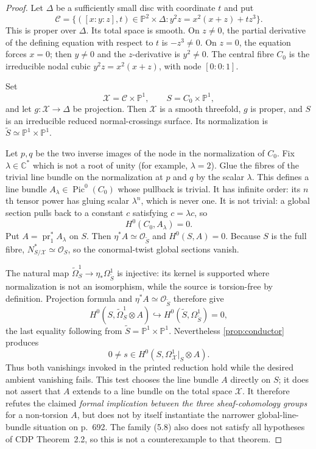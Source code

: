 \begin{proof}
Let $\Delta$ be a sufficiently small disc with coordinate $t$ and put
\[
\mathcal C=
\{([x:y:z],t)\in\mathbb P^2\times\Delta:
y^2z=x^2(x+z)+tz^3\}.
\tag{5.8}
\]
This is proper over $\Delta$.  Its total space is smooth.  On $z\ne0$, the
partial derivative of the defining equation with respect to $t$ is
$-z^3\ne0$.  On $z=0$, the equation forces $x=0$; then $y\ne0$ and the
$z$-derivative is $y^2\ne0$.  The central fibre $C_0$ is the irreducible
nodal cubic $y^2z=x^2(x+z)$, with node $[0:0:1]$.

Set
\[
\mathcal X=\mathcal C\times\mathbb P^1,\qquad
S=C_0\times\mathbb P^1,
\]
and let $g:\mathcal X\to\Delta$ be projection.  Then $\mathcal X$ is a
smooth threefold, $g$ is proper, and $S$ is an irreducible reduced
normal-crossings surface.  Its normalization is
$\widetilde S\simeq\mathbb P^1\times\mathbb P^1$.

Let $p,q$ be the two inverse images of the node in the normalization of
$C_0$.  Fix $\lambda\in\mathbb C^*$ which is not a root of unity (for
example, $\lambda=2$).  Glue the fibres of
the trivial line bundle on the normalization at $p$ and $q$ by the scalar
$\lambda$.  This defines a line bundle
$A_\lambda\in\operatorname{Pic}^0(C_0)$ whose pullback is trivial.  It has
infinite order: its $n$th tensor power has gluing scalar $\lambda^n$, which
is never one.  It is not trivial: a global section pulls back to a constant
$c$ satisfying
$c=\lambda c$, so
\[
H^0(C_0,A_\lambda)=0.
\tag{5.9}
\]
Put $A=\operatorname{pr}_1^*A_\lambda$ on $S$.  Then
$\eta^*A\simeq\mathcal O_{\widetilde S}$ and $H^0(S,A)=0$.
Because $S$ is the full fibre,
$N^*_{S/\mathcal X}\simeq\mathcal O_S$, so the conormal-twist global
sections vanish.

The natural map
$\widetilde\Omega^1_S\to\eta_*\Omega^1_{\widetilde S}$ is injective:
its kernel is supported where normalization is not an isomorphism, while
the source is torsion-free by definition.  Projection formula and
$\eta^*A\simeq\mathcal O_{\widetilde S}$ therefore give
\[
H^0(S,\widetilde\Omega^1_S\otimes A)
\hookrightarrow
H^0(\widetilde S,\Omega^1_{\widetilde S})=0,
\tag{5.10}
\]
the last equality following from
$\widetilde S=\mathbb P^1\times\mathbb P^1$.
Nevertheless \cref{prop:conductor} produces
\[
0\ne s\in H^0(S,\Omega^1_{\mathcal X}|_S\otimes A).
\]
Thus both vanishings invoked in the printed reduction hold while the desired
ambient vanishing fails.  This test chooses the line bundle $A$ directly on
$S$; it does not assert that $A$ extends to a line bundle on the total space
$\mathcal X$.  It therefore refutes the claimed \emph{formal implication
between the three sheaf-cohomology groups} for a non-torsion $A$, but does
not by itself instantiate the narrower global-line-bundle situation on
p.~692.  The family (5.8) also does not satisfy all hypotheses of CDP
Theorem~2.2, so this is not a counterexample to that theorem.
\end{proof}

